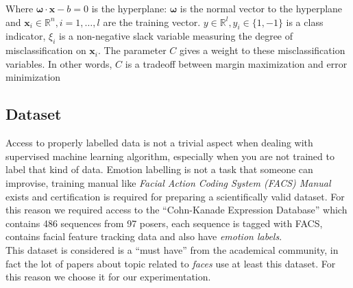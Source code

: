  Where $\boldsymbol{\omega} \cdot \textbf{x} - b = 0$ is the hyperplane:
 $\boldsymbol{\omega}$ is the normal vector to the hyperplane and $\textbf{x}_i
 \in \mathbb{R}^n, i = 1,\dots,l$ are the training vector.  $y \in \mathbb{R}^l,
 y_i \in \{1, -1\}$ is a class indicator, $\xi_i$ is a non-negative slack
 variable measuring the degree of misclassification on $\textbf{x}_i$. The
 parameter $C$ gives a weight to these misclassification variables. In other
 words, $C$ is a tradeoff between margin maximization and error minimization

\subsection{Dataset}

Access to properly labelled data is not a trivial aspect when dealing with supervised machine learning algorithm, especially when you are not trained to label that kind of data. Emotion labelling is not a task that someone can improvise, training manual like \emph{Facial Action Coding System (FACS) Manual} exists and certification is required for preparing a scientifically valid dataset. For this reason we required access to the ``Cohn-Kanade Expression Database''\cite{Kanade2000} which contains 486 sequences from 97 posers, each sequence is tagged with FACS, contains facial feature tracking data and also have \emph{emotion labels}. \\

This dataset is considered is a ``must have'' from the academical community, in fact the lot of papers about topic related to \emph{faces} use at least this dataset. For this reason we choose it for our experimentation. 



